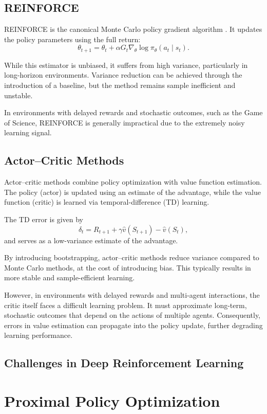 \documentclass[english,bachelor]{hsluthesis}
\begin{document}
\subsection{REINFORCE}
REINFORCE is the canonical Monte Carlo policy gradient algorithm \cite{sutton2018reinforcement}. It updates the policy parameters using the full return:
\[
\theta_{t+1}
=
\theta_t
+
\alpha
G_t
\nabla_\theta \log \pi_\theta(a_t \mid s_t).
\]

While this estimator is unbiased, it suffers from high variance, particularly in long-horizon environments. Variance reduction can be achieved through the introduction of a baseline, but the method remains sample inefficient and unstable.

In environments with delayed rewards and stochastic outcomes, such as the Game of Science, REINFORCE is generally impractical due to the extremely noisy learning signal.



\subsection{Actor--Critic Methods}
Actor--critic methods combine policy optimization with value function estimation. The policy (actor) is updated using an estimate of the advantage, while the value function (critic) is learned via temporal-difference (TD) learning.

The TD error is given by
\[
\delta_t = R_{t+1} + \gamma \hat{v}(S_{t+1}) - \hat{v}(S_t),
\]
and serves as a low-variance estimate of the advantage.

By introducing bootstrapping, actor--critic methods reduce variance compared to Monte Carlo methods, at the cost of introducing bias. This typically results in more stable and sample-efficient learning.

However, in environments with delayed rewards and multi-agent interactions, the critic itself faces a difficult learning problem. It must approximate long-term, stochastic outcomes that depend on the actions of multiple agents. Consequently, errors in value estimation can propagate into the policy update, further degrading learning performance.



\subsection{Challenges in Deep Reinforcement Learning}

\section{Proximal Policy Optimization}
\end{document}
